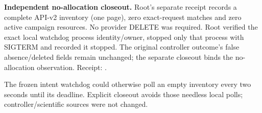 \textbf{Independent no-allocation closeout.} Root's separate receipt records a
complete API-v2 inventory (one page), zero exact-request matches and zero
active campaign resources. No provider DELETE was required. Root verified the
exact local watchdog process identity/owner, stopped only that process with
SIGTERM and recorded it stopped. The original controller outcome's false
absence/deleted fields remain unchanged; the separate closeout binds the
no-allocation observation. Receipt:
.

The frozen intent watchdog could otherwise poll an empty inventory every two
seconds until its deadline. Explicit closeout avoids those needless local
polls; controller/scientific sources were not changed.
